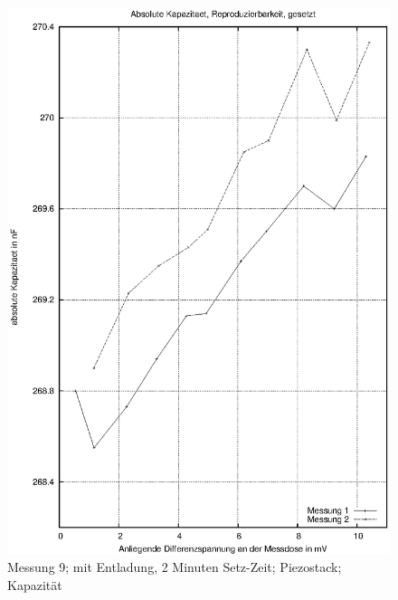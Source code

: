 \documentclass[12pt]{scrreprt} %
\begin{document}
\begin {figure}[htbp]
      \begin{center}
        \includegraphics{tabelle2_2_4}
      \end{center}
\caption{Messung 9; mit Entladung, 2 Minuten Setz-Zeit; Piezostack; Kapazität}
\label{fig:2.9}
\end{figure}
\setlongtables
\end{document}
